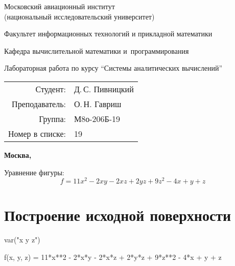\documentclass{article}
\begin{document}
	\begin{center}
		\bfseries
		
		{\Large Московский авиационный институт\\ (национальный исследовательский университет)
			
		}
		
		\vspace{48pt}
		
		{\large Факультет информационных технологий и прикладной математики
		}
		
		\vspace{36pt}
		
		{\large Кафедра вычислительной математики и~программирования
			
		}
		
		
		\vspace{48pt}
		
		Лабораторная работа  по курсу \enquote{Системы аналитических вычислений}
		
	\end{center}
	
	\vspace{72pt}
	
	\begin{flushright}
		\begin{tabular}{rl}
			Студент: & Д.\,С. Пивницкий \\
			Преподаватель: & О.\,Н. Гавриш \\
			Группа: & М8о-206Б-19 \\
			Номер в списке: & 19 \\
		\end{tabular}
	\end{flushright}
	
	\vfill
	
	\begin{center}
		\bfseries
		Москва, \the\year
	\end{center}

\pagebreak

Уравнение фигуры:
$$f = 11x^2 - 2xy - 2xz + 2yz + 9z^2 - 4x + y + z$$

\section{Построение исходной поверхности}
\begin{sagesilent}
var("x y z")
\end{sagesilent}
\begin{sageblock}
f(x, y, z) = 11*x**2 - 2*x*y - 2*x*z + 2*y*z + 9*z**2 - 4*x + y + z
\end{sageblock}
\end{document}
